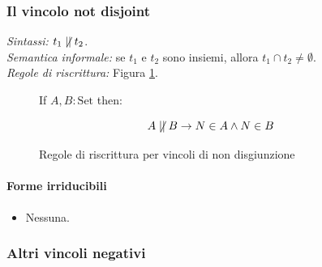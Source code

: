 \documentclass[12pt,a4paper,openright]{book}  %
\begin{document}

\subsubsection{Il vincolo not disjoint}

\textit{Sintassi:} $t_1 \not\mid\mid t_2$.\\
\noindent\textit{Semantica informale:} se $t_1$ e $t_2$ sono insiemi, allora $t_1 \cap t_2 \neq \emptyset$.\\
\noindent\textit{Regole di riscrittura:} Figura \ref{fig:notdisj_constraints}.

\begin{figure}
	\begin{tcolorbox}[colframe=black, colback=white, sharp corners]
		\setcounter{equation}{6}
		\renewcommand{\theequation}{$\mid\mid$\textsubscript{\arabic{equation}}}

		If $A, B: \text{Set}$ then:

		\begin{equation}
		A \not\mid\mid B \to N \in A \land N \in B
		\end{equation}

	\end{tcolorbox}

	\caption{Regole di riscrittura per vincoli di non disgiunzione}
	\label{fig:notdisj_constraints}
\end{figure}

\paragraph{Forme irriducibili}
\begin{itemize}
	\item Nessuna.
\end{itemize}


\subsubsection{Altri vincoli negativi}
\end{document}

